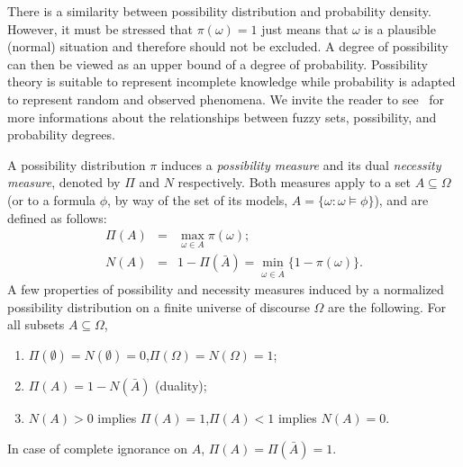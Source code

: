 \documentclass{llncs}
\begin{document}
There is a similarity between possibility distribution and probability 
density. However, it must be stressed that $\pi(\omega) = 1$ just means that
$\omega$ is a plausible (normal) situation and therefore should not be excluded.
A degree of possibility can then be viewed as an upper bound of a degree of probability.
Possibility theory is suitable to represent incomplete knowledge while 
probability is adapted to represent random and observed phenomena. 
We invite the reader to see~\cite{dubois1991} for more informations
about the relationships between fuzzy sets, possibility, and probability 
degrees.

A possibility distribution $\pi$ induces a \emph{possibility
measure} and its dual \emph{necessity
measure}, denoted by $\Pi$ and $N$
respectively. Both measures apply to a set $A \subseteq\Omega$ (or to a
formula $\phi$, by way of the set of its models, $A = \{\omega : \omega \models \phi\}$),
and are defined as follows:
\begin{eqnarray}
  \Pi(A) &=& \max_{\omega\in A} \pi(\omega); \\
  N(A)   &=& 1 - \Pi(\bar{A}) = \min_{\omega\in \bar{A}} \{1 - \pi(\omega)\}.
\end{eqnarray}
%
A few properties of possibility and necessity measures 
induced by a normalized possibility distribution on a finite universe of
discourse $\Omega$ are the following. For all subsets $A\subseteq \Omega$,
\begin{enumerate}
  \item $\Pi(\emptyset) = N(\emptyset) = 0$,\quad $\Pi(\Omega) = N(\Omega) = 1$;
  \item $\Pi(A) = 1 - N(\bar{A})$ (duality);
  \item $N(A) > 0$ implies $\Pi(A) = 1$,\quad $\Pi(A) < 1$ implies $N(A) = 0$.
\end{enumerate}
In case of complete ignorance on $A$, $\Pi(A) = \Pi(\bar{A}) = 1$.
\end{document}
